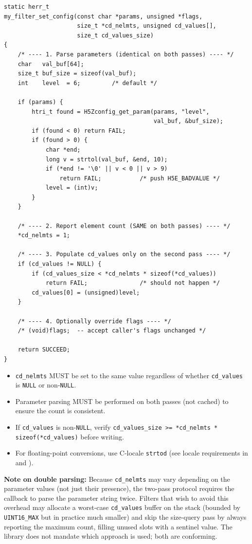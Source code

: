 \documentclass[../HDF5_RFC.tex]{subfiles}
\begin{document}
\begin{verbatim}
static herr_t
my_filter_set_config(const char *params, unsigned *flags,
                     size_t *cd_nelmts, unsigned cd_values[],
                     size_t cd_values_size)
{
    /* ---- 1. Parse parameters (identical on both passes) ---- */
    char   val_buf[64];
    size_t buf_size = sizeof(val_buf);
    int    level  = 6;         /* default */

    if (params) {
        htri_t found = H5Zconfig_get_param(params, "level",
                                           val_buf, &buf_size);
        if (found < 0) return FAIL;
        if (found > 0) {
            char *end;
            long v = strtol(val_buf, &end, 10);
            if (*end != '\0' || v < 0 || v > 9)
                return FAIL;           /* push H5E_BADVALUE */
            level = (int)v;
        }
    }

    /* ---- 2. Report element count (SAME on both passes) ---- */
    *cd_nelmts = 1;

    /* ---- 3. Populate cd_values only on the second pass ---- */
    if (cd_values != NULL) {
        if (cd_values_size < *cd_nelmts * sizeof(*cd_values))
            return FAIL;               /* should not happen */
        cd_values[0] = (unsigned)level;
    }

    /* ---- 4. Optionally override flags ---- */
    /* (void)flags;  -- accept caller's flags unchanged */

    return SUCCEED;
}
\end{verbatim}

\begin{itemize}
\item \texttt{cd\_nelmts} MUST be set to the same value regardless of whether
  \texttt{cd\_values} is \texttt{NULL} or non-\texttt{NULL}.
\item Parameter parsing MUST be performed on both passes (not cached) to
  ensure the count is consistent.
\item If \texttt{cd\_values} is non-\texttt{NULL}, verify
  \texttt{cd\_values\_size >= *cd\_nelmts * sizeof(*cd\_values)} before writing.
\item For floating-point conversions, use C-locale \texttt{strtod} (see locale
  requirements in  and ).
\end{itemize}

\textbf{Note on double parsing:} Because \texttt{cd\_nelmts} may vary depending on
the parameter values (not just their presence), the two-pass protocol requires
the callback to parse the parameter string twice.  Filters that wish to avoid
this overhead may allocate a worst-case \texttt{cd\_values} buffer on the stack
(bounded by \texttt{UINT16\_MAX} but in practice much smaller) and skip the
size-query pass by always reporting the maximum count, filling unused slots
with a sentinel value.  The library does not mandate which approach is used;
both are conforming.
\end{document}
